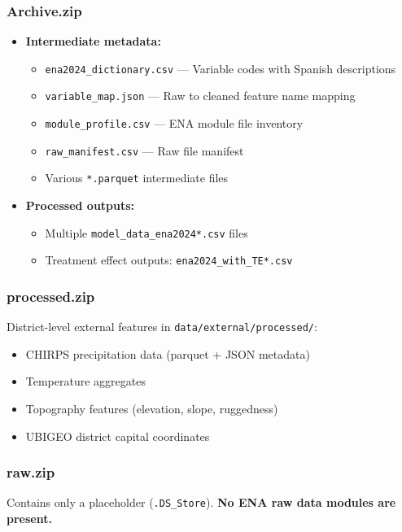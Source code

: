 \documentclass[11pt,a4paper]{article}
\begin{document}
\subsubsection{Archive.zip}
\begin{itemize}[leftmargin=1.5em]
    \item \textbf{Intermediate metadata:}
    \begin{itemize}
        \item \texttt{ena2024\_dictionary.csv} --- Variable codes with Spanish descriptions
        \item \texttt{variable\_map.json} --- Raw to cleaned feature name mapping
        \item \texttt{module\_profile.csv} --- ENA module file inventory
        \item \texttt{raw\_manifest.csv} --- Raw file manifest
        \item Various \texttt{*.parquet} intermediate files
    \end{itemize}
    \item \textbf{Processed outputs:}
    \begin{itemize}
        \item Multiple \texttt{model\_data\_ena2024*.csv} files
        \item Treatment effect outputs: \texttt{ena2024\_with\_TE*.csv}
    \end{itemize}
\end{itemize}

\subsubsection{processed.zip}
District-level external features in \texttt{data/external/processed/}:
\begin{itemize}[leftmargin=1.5em]
    \item CHIRPS precipitation data (parquet + JSON metadata)
    \item Temperature aggregates
    \item Topography features (elevation, slope, ruggedness)
    \item UBIGEO district capital coordinates
\end{itemize}

\subsubsection{raw.zip}
Contains only a placeholder (\texttt{.DS\_Store}). \textbf{No ENA raw data modules are present.}
\end{document}
